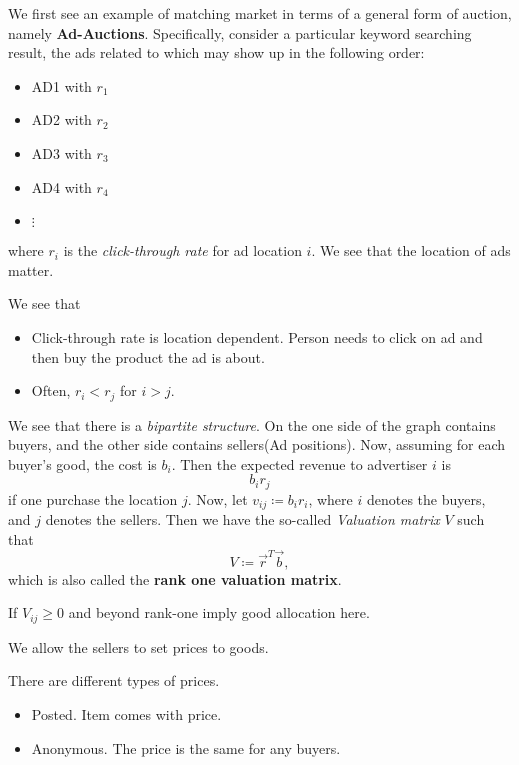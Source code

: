 \begin{eg}
	We first see an example of matching market in terms of a general form of auction, namely \textbf{Ad-Auctions}. Specifically, consider a particular keyword searching result,
	the ads related to which may show up in the following order:
	\begin{itemize}
		\item AD1 with \(r_1\)
		\item AD2 with \(r_2\)
		\item AD3 with \(r_3\)
		\item AD4 with \(r_4\)
		\item \(\vdots\)
	\end{itemize}
	where \(r_i\) is the \emph{click-through rate} for ad location \(i\). We see that the location of ads matter.

	\begin{note}
		We see that
		\begin{itemize}
			\item Click-through rate is location dependent. Person needs to click on ad and then buy the product the ad is about.
			\item Often, \(r_i < r_j\) for \(i > j\).
		\end{itemize}
	\end{note}
\end{eg}

\hr

We see that there is a \emph{bipartite structure}. On the one side of the graph contains buyers, and the other side contains sellers(Ad positions).
Now, assuming for each buyer's good, the cost is \(b_i\). Then the expected revenue to advertiser \(i\) is
\[
	b_i r_j
\] if one purchase the location \(j\). Now, let \(v_{ij} \coloneqq b_{i}r_{i}\), where \(i\) denotes the buyers, and \(j\) denotes the sellers.
Then we have the so-called \emph{Valuation matrix} \(V\) such that
\[
	V \coloneqq  \vec{r}^{T}\vec{b},
\]
which is also called the \textbf{rank one valuation matrix}.

If \(V_{ij}\geq 0\) and beyond rank-one imply good allocation here.

We allow the sellers to set prices to goods.
\begin{remark}
	There are different types of prices.
	\begin{itemize}
		\item Posted. Item comes with price.
		\item Anonymous. The price is the same for any buyers.
	\end{itemize}
\end{remark}

